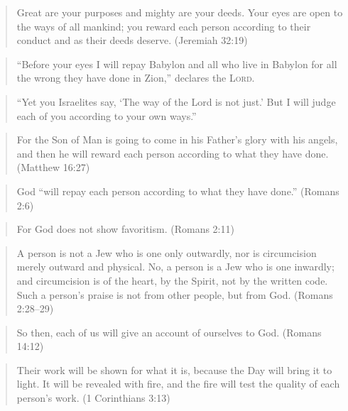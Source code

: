 \begin{quote}
    Great are your purposes and mighty are your deeds. Your eyes are open to the
    ways of all mankind; you reward each person according to their conduct and
    as their deeds deserve. (Jeremiah 32:19)
\end{quote}

\begin{quote}
    \enquote{Before your eyes I will repay Babylon and all who live in Babylon
    for all the wrong they have done in Zion,} declares the \textsc{Lord}.
\end{quote}

\begin{quote}
    \enquote{Yet you Israelites say, \enquote{The way of the Lord is not just.}
    But I will judge each of you according to your own ways.}
\end{quote}

\begin{quote}
    For the Son of Man is going to come in his Father's glory with his angels,
    and then he will reward each person according to what they have done.
    (Matthew 16:27)
\end{quote}

\begin{quote}
    God \enquote{will repay each person according to what they have done.}
    (Romans 2:6)
\end{quote}

\begin{quote}
    For God does not show favoritism. (Romans 2:11)
\end{quote}

\begin{quote}
    A person is not a Jew who is one only outwardly, nor is circumcision merely
    outward and physical. No, a person is a Jew who is one inwardly; and
    circumcision is of the heart, by the Spirit, not by the written code. Such a
    person's praise is not from other people, but from God. (Romans 2:28--29)
\end{quote}

\begin{quote}
    So then, each of us will give an account of ourselves to God. (Romans 14:12)
\end{quote}

\begin{quote}
    Their work will be shown for what it is, because the Day will bring it to
    light. It will be revealed with fire, and the fire will test the quality of
    each person's work. (1 Corinthians 3:13)
\end{quote}

